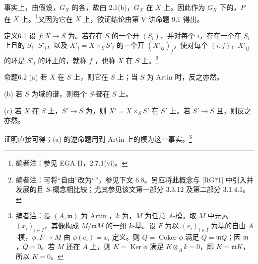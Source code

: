 事实上，由假设，$G_X$ 的各，故由 2.1(b)，$G_X$ 在 $X$ 上。因此作为 $G_X$ 下的，$P$ 在 $X$ 上。\footnote[21]{编者注：参见 EGA II，2.7.1(vi)。}又因为它在 $X$ 上，欲证结论由第 V 讲命题 9.1 得出。
\begingroup\renewcommand{\thefootnote}{\ensuremath{*}}
\begin{SGAresult}{定义}{6.1}
设 $f:X\to S$ 为。若存在 $S$ 的一个开 $(S_i)$，并对每个 $i$，存在一个在 $S_i$ 上且的 $S_i$- $S'_i$，以及 $X'_i=X\times_SS'_i$ 的一个开 $(X'_{ij})_j$，使对每个 $(i,j)$，$X'_{ij}$ 的环是 $S'_i$ 的环上的，就称 $f$ ，也称 $X$ 在 $S$ 上。\footnote[22]{编者注：可将“自由”改为“”，参见下文 6.8。另应将此概念与 [RG71] 中引入并发展的且 $S$-概念相比较；尤其参见该文第一部分 3.3.12 及第二部分 3.1.4.1。}
\end{SGAresult}
\begin{SGAresult}{命题}{6.2}
(a) 若 $X$ 在 $S$ 上，则它在 $S$ 上；当 $S$ 为 Artin 时，反之亦然。

(b) 若 $S$ 为域的谱，则每个 $S$-都在 $S$ 上。

(c) 若 $X$ 在 $S$ 上，$S'\to S$ 为，则 $X'=X\times_SS'$ 在 $S'$ 上。若 $S'\to S$ 且，则反之亦然。
\end{SGAresult}
证明直接可得；(a) 的逆命题用到 Artin 上的模为这一事实。\footnote[23]{编者注：设 $(A,\mathfrak m)$ 为 Artin ，$k$ 为，$M$ 为任意 $A$-模。取 $M$ 中元素 $(x_i)_{i\in I}$，其像构成 $M/\mathfrak mM$ 的一组 $k$-基。设 $F$ 为以 $(e_i)_{i\in I}$ 为基的自由 $A$-模，$\phi:F\to M$ 由 $\phi(e_i)=x_i$ 定义。则 $Q=\operatorname{Coker}\phi$ 满足 $Q=\mathfrak mQ$；因 $\mathfrak m$ ，$Q=0$。若 $M$ 还在 $A$ 上，则 $K=\operatorname{Ker}\phi$ 满足 $K\otimes_Ak=0$，即 $K=\mathfrak mK$，所以 $K=0$。}

